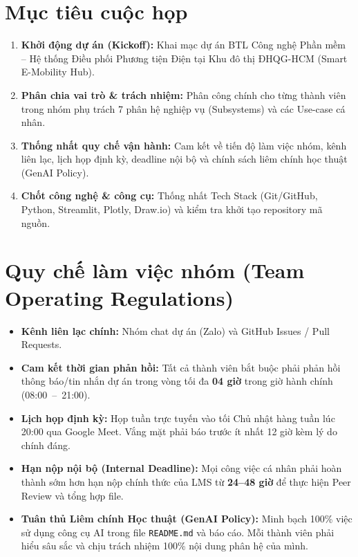 \documentclass[11pt,a4paper]{article}
\begin{document}
\vspace{6pt}

\section{Mục tiêu cuộc họp}

\begin{enumerate}[label=\textbf{\arabic*.}, leftmargin=2em, itemsep=2pt]
  \item \textbf{Khởi động dự án (Kickoff):} Khai mạc dự án BTL Công nghệ Phần mềm -- Hệ thống Điều phối Phương tiện Điện tại Khu đô thị ĐHQG-HCM (Smart E-Mobility Hub).
  \item \textbf{Phân chia vai trò \& trách nhiệm:} Phân công chính cho từng thành viên trong nhóm phụ trách 7 phân hệ nghiệp vụ (Subsystems) và các Use-case cá nhân.
  \item \textbf{Thống nhất quy chế vận hành:} Cam kết về tiến độ làm việc nhóm, kênh liên lạc, lịch họp định kỳ, deadline nội bộ và chính sách liêm chính học thuật (GenAI Policy).
  \item \textbf{Chốt công nghệ \& công cụ:} Thống nhất Tech Stack (Git/GitHub, Python, Streamlit, Plotly, Draw.io) và kiểm tra khởi tạo repository mã nguồn.
\end{enumerate}

\section{Quy chế làm việc nhóm (Team Operating Regulations)}

\begin{itemize}[leftmargin=2em, itemsep=3pt]
  \item \textbf{Kênh liên lạc chính:} Nhóm chat dự án (Zalo) và GitHub Issues / Pull Requests.
  \item \textbf{Cam kết thời gian phản hồi:} Tất cả thành viên bắt buộc phải phản hồi thông báo/tin nhắn dự án trong vòng tối đa \textbf{04 giờ} trong giờ hành chính (08:00~--~21:00).
  \item \textbf{Lịch họp định kỳ:} Họp tuần trực tuyến vào tối Chủ nhật hàng tuần lúc 20:00 qua Google Meet. Vắng mặt phải báo trước ít nhất 12 giờ kèm lý do chính đáng.
  \item \textbf{Hạn nộp nội bộ (Internal Deadline):} Mọi công việc cá nhân phải hoàn thành sớm hơn hạn nộp chính thức của LMS từ \textbf{24--48 giờ} để thực hiện Peer Review và tổng hợp file.
  \item \textbf{Tuân thủ Liêm chính Học thuật (GenAI Policy):} Minh bạch 100\% việc sử dụng công cụ AI trong file \texttt{README.md} và báo cáo. Mỗi thành viên phải hiểu sâu sắc và chịu trách nhiệm 100\% nội dung phân hệ của mình.
\end{itemize}
\end{document}
